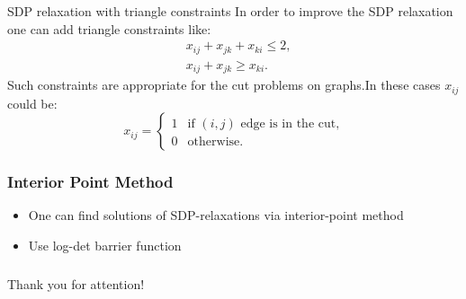 \documentclass[10pt]{beamer}
\begin{document}
        \begin{frame}{SDP relaxation with triangle constraints}
            In order to improve the SDP relaxation one can add triangle constraints like:
            \begin{align*}
                &x_{ij} + x_{jk} + x_{ki} \leq 2, \\
                &x_{ij} + x_{jk} \geq x_{ki}.
            \end{align*}
            Such constraints are appropriate for the cut problems on graphs.In these cases $x_{ij}$ could be:
            \[
                x_{ij} = \begin{cases} 1 & \text{if } (i, j) \text{ edge is in the cut,} \\ 
                0 & \text{otherwise.}\end{cases}
            \]
            
        \end{frame}

	\begin{frame}
		\frametitle{Interior Point Method}
		
		\begin{itemize}
			\item One can find solutions of SDP-relaxations via interior-point method
			\item Use log-det barrier function
		\end{itemize}
		
	\end{frame}
		
	
	\begin{frame}
		\frametitle{}
		
		\begin{center}
			{\LARGE Thank you for attention!}
		\end{center}
		
	\end{frame}
\end{document}
